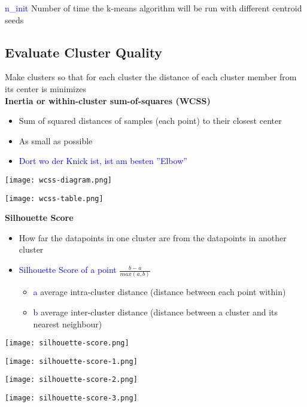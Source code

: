 \textcolor{blue}{n\_init} Number of time the k-means algorithm will be run with different centroid seeds

\vfill\null
\columnbreak
\subsection{Evaluate Cluster Quality}
Make clusters so that for each cluster the distance of each cluster member from its center is minimizes \\

\textbf{Inertia or within-cluster sum-of-squares (WCSS)}
\begin{itemize}
    \item Sum of squared distances of samples (each point) to their closest center
    \item As small as possible
    \item \textcolor{blue}{Dort wo der Knick ist, ist am besten ''Elbow''}
\end{itemize}

\begin{minipage}[t]{0.5\linewidth}
    \texttt{[image: wcss-diagram.png]}
\end{minipage}
\begin{minipage}[t]{0.5\linewidth}
    \texttt{[image: wcss-table.png]}
\end{minipage}
\vspace{10pt}
\textbf{Silhouette Score}
\begin{itemize}
    \item How far the datapoints in one cluster are from the datapoints in another cluster
    \item \textcolor{blue}{Silhouette Score of a point} $\frac{b-a}{max(a,b)}$
    \begin{itemize}
        \item \textcolor{blue}{a} average intra-cluster distance (distance between each point within)
        \item \textcolor{blue}{b} average inter-cluster distance (distance between a cluster and its nearest neighbour)
    \end{itemize}
\end{itemize}
\texttt{[image: silhouette-score.png]}

\texttt{[image: silhouette-score-1.png]}

\texttt{[image: silhouette-score-2.png]}

\texttt{[image: silhouette-score-3.png]}

